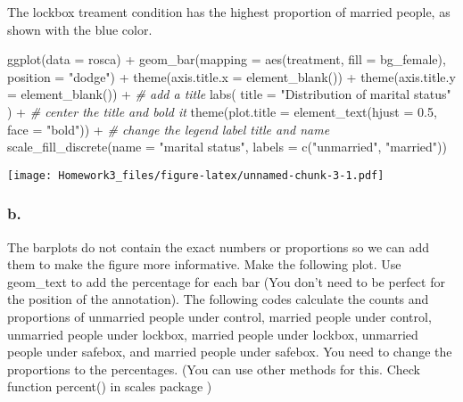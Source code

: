 \documentclass[
]{article}
\newenvironment{Shaded}{\begin{snugshade}}{\end{snugshade}}
\newcommand{\AttributeTok}[1]{\textcolor[rgb]{0.77,0.63,0.00}{#1}}
\newcommand{\CommentTok}[1]{\textcolor[rgb]{0.56,0.35,0.01}{\textit{#1}}}
\newcommand{\FloatTok}[1]{\textcolor[rgb]{0.00,0.00,0.81}{#1}}
\newcommand{\FunctionTok}[1]{\textcolor[rgb]{0.00,0.00,0.00}{#1}}
\newcommand{\NormalTok}[1]{#1}
\newcommand{\SpecialCharTok}[1]{\textcolor[rgb]{0.00,0.00,0.00}{#1}}
\newcommand{\StringTok}[1]{\textcolor[rgb]{0.31,0.60,0.02}{#1}}
\begin{document}
The lockbox treament condition has the highest proportion of married
people, as shown with the blue color.

\begin{Shaded}
\begin{Highlighting}[]
\FunctionTok{ggplot}\NormalTok{(}\AttributeTok{data =}\NormalTok{ rosca) }\SpecialCharTok{+} 
  \FunctionTok{geom\_bar}\NormalTok{(}\AttributeTok{mapping =} \FunctionTok{aes}\NormalTok{(treatment, }\AttributeTok{fill =}\NormalTok{ bg\_female), }
           \AttributeTok{position =} \StringTok{"dodge"}\NormalTok{) }\SpecialCharTok{+} 
  \FunctionTok{theme}\NormalTok{(}\AttributeTok{axis.title.x =} \FunctionTok{element\_blank}\NormalTok{()) }\SpecialCharTok{+} 
  \FunctionTok{theme}\NormalTok{(}\AttributeTok{axis.title.y =} \FunctionTok{element\_blank}\NormalTok{()) }\SpecialCharTok{+} 
  \CommentTok{\# add a title }
  \FunctionTok{labs}\NormalTok{(}
    \AttributeTok{title =} \StringTok{"Distribution of marital status"}
\NormalTok{  ) }\SpecialCharTok{+} 
  \CommentTok{\# center the title and bold it}
  \FunctionTok{theme}\NormalTok{(}\AttributeTok{plot.title =} \FunctionTok{element\_text}\NormalTok{(}\AttributeTok{hjust =} \FloatTok{0.5}\NormalTok{, }\AttributeTok{face =} \StringTok{"bold"}\NormalTok{)) }\SpecialCharTok{+} 
  \CommentTok{\# change the legend label title and name}
  \FunctionTok{scale\_fill\_discrete}\NormalTok{(}\AttributeTok{name =} \StringTok{"marital status"}\NormalTok{,}
                      \AttributeTok{labels =} \FunctionTok{c}\NormalTok{(}\StringTok{"unmarried"}\NormalTok{, }\StringTok{"married"}\NormalTok{))}
\end{Highlighting}
\end{Shaded}

\texttt{[image: Homework3\_files/figure-latex/unnamed-chunk-3-1.pdf]}

\hypertarget{b.}{%
\subsubsection{b.}\label{b.}}

The barplots do not contain the exact numbers or proportions so we can
add them to make the figure more informative. Make the following plot.
Use geom\_text to add the percentage for each bar (You don't need to be
perfect for the position of the annotation). The following codes
calculate the counts and proportions of unmarried people under control,
married people under control, unmarried people under lockbox, married
people under lockbox, unmarried people under safebox, and married people
under safebox. You need to change the proportions to the percentages.
(You can use other methods for this. Check function percent() in scales
package )
\end{document}
